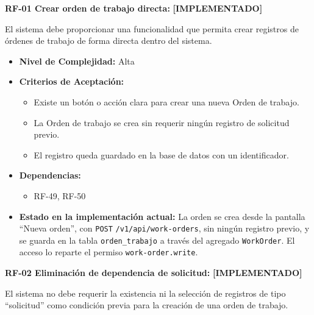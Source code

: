 \documentclass[12pt,a4paper]{article}
\newcommand{\ruta}[1]{\nolinkurl{#1}}
\newcommand{\estadoImplementado}{\textcolor{mainRed}{\textbf{[IMPLEMENTADO]}}}
\begin{document}
\textbf{RF-01 Crear orden de trabajo directa:} \estadoImplementado{}

El sistema debe proporcionar una funcionalidad que permita crear registros de órdenes de trabajo de forma directa dentro del sistema.

\begin{itemize}
  \item \textbf{Nivel de Complejidad:} Alta

  \item \textbf{Criterios de Aceptación:}
  \begin{itemize}
    \item Existe un botón o acción clara para crear una nueva Orden de trabajo.
    \item La Orden de trabajo se crea sin requerir ningún registro de solicitud previo.
    \item El registro queda guardado en la base de datos con un identificador.
  \end{itemize}

  \item \textbf{Dependencias:}
  \begin{itemize}
    \item RF-49, RF-50
  \end{itemize}

  \item \textbf{Estado en la implementación actual:} La orden se crea desde la pantalla ``Nueva orden'', con \texttt{POST} \ruta{/v1/api/work-orders}, sin ningún registro previo, y se guarda en la tabla \texttt{orden\_trabajo} a través del agregado \texttt{WorkOrder}. El acceso lo reparte el permiso \texttt{work-order.write}.
\end{itemize}

\textbf{RF-02 Eliminación de dependencia de solicitud:} \estadoImplementado{}

El sistema no debe requerir la existencia ni la selección de registros de tipo ``solicitud'' como condición previa para la creación de una orden de trabajo.
\end{document}
